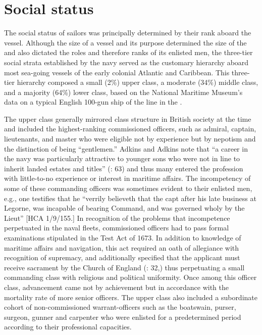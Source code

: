 \section{{Social status}}\label{sec:3.7}

  The social status of sailors was principally determined by their rank aboard the vessel. Although the size of a vessel and its purpose determined the size of the  and also dictated the roles and therefore ranks of its enlisted men, the three-tier social strata established by the navy served as the customary hierarchy aboard most sea-going vessels of the early colonial Atlantic and Caribbean. This three-tier hierarchy composed a small (2\%) upper class, a moderate (34\%) middle class, and a majority (64\%) lower class, based on the National Maritime Museum’s data on a typical English 100-gun ship of the line in the . 

The upper class generally mirrored class structure in British society at the time and included the highest-ranking commissioned officers, such as admiral, captain, lieutenants, and master who were eligible not by experience but by nepotism and the distinction of being “gentlemen.” Adkins and Adkins note that “a career in the navy was particularly attractive to younger sons who were not in line to inherit landed estates and titles” (\citeyear*{AdkinsAdkins2008}: 63) and thus many entered the profession with little-to-no experience or interest in maritime affairs. The incompetency of some of these commanding officers was sometimes evident to their enlisted men, e.g., one  testifies that he “verrily believeth that the capt after his late business at Legorne, was incapable of bearing Command, and was governed wholy by the Lieut” [HCA 1/9/155.] In recognition of the problems that incompetence perpetuated in the naval fleets, commissioned officers had to pass formal examinations stipulated in the Test Act of 1673. In addition to knowledge of maritime affairs and navigation, this act required an oath of allegiance with recognition of supremacy, and additionally specified that the applicant must receive sacrament by the Church of England (\citealt{AdkinsAdkins2008}: 32,) thus perpetuating a small commanding class with religious and political uniformity. Once among this officer class, advancement came not by achievement but in accordance with the mortality rate of more senior officers. The upper class also included a subordinate cohort of non-commissioned warrant-officers such as the boatswain, purser, surgeon, gunner and carpenter who were enlisted for a predetermined period according to their professional capacities.  

